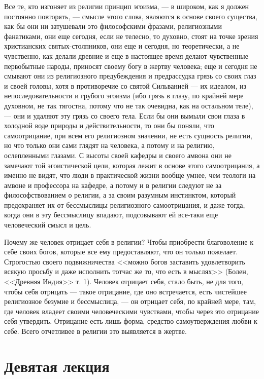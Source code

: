 \documentclass[12pt]{article}
\begin{document}
Все те, кто изгоняет из религии принцип эгоизма, --- в широком, как я должен постоянно повторять, --- смысле этого слова, являются в основе своего существа, как бы они ни затушевали это философскими фразами, религиозными фанатиками, они еще сегодня, если не телесно, то духовно, стоят на точке зрения христианских святых-столпников, они еще и сегодня, но теоретически, а не чувственно, как делали древние и еще в настоящее время делают чувственные первобытные народы, приносят своему богу в жертву человека; еще и сегодня не смывают они из религиозного предубеждения и предрассудка грязь со своих глаз и своей головы, хотя в противоречие со святой Сильванией --- их идеалом, из непоследовательности и грубого эгоизма (ибо грязь в глазу, по крайней мере духовном, не так тягостна, потому что не так очевидна, как на остальном теле), --- они и удаляют эту грязь со своего тела. Если бы они вымыли свои глаза в холодной воде природы и действительности, то они бы поняли, что самоотрицание, при всем его религиозном значении, не есть сущность религии, но что только они сами глядят на человека, а потому и на религию, ослепленными глазами. С высоты своей кафедры и своего амвона они не замечают той эгоистической цели, которая лежит в основе этого самоотрицания, а именно не видят, что люди в практической жизни вообще умнее, чем теологи на амвоне и профессора на кафедре, а потому и в религии следуют не за философствованием о религии, а за своим разумным инстинктом, который предохраняет их от бессмыслицы религиозного самоотрицания, и даже тогда, когда они в эту бессмыслицу впадают, подсовывают ей все-таки еще человеческий смысл и цель. 

Почему же человек отрицает себя в религии? Чтобы приобрести благоволение к себе своих богов, которые все ему предоставляют, что он только пожелает. Строгостью своего подвижничества <<можно богов заставить удовлетворить всякую просьбу и даже исполнить тотчас же то, что есть в мыслях>> (Болен, <<Древняя Индия>> т. 1). Человек отрицает себя, стало быть, не для того, чтобы себя отрицать --- такое отрицание, где оно встречается, есть чистейшее религиозное безумие и бессмыслица, --- он отрицает себя, по крайней мере, там, где человек владеет своими человеческими чувствами, чтобы через это отрицание себя утвердить. Отрицание есть лишь форма, средство самоутверждения любви к себе. Всего отчетливее в религии это выявляется в жертве. 

{}
\section*{Девятая лекция}
\end{document}
